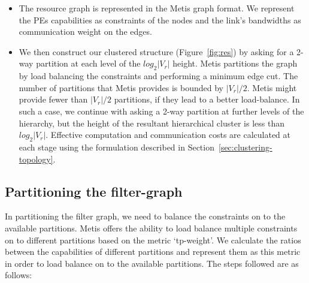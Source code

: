 \begin{itemize}


\item The resource graph is represented in the Metis graph format. We
  represent the PEs capabilities as constraints of the nodes and the
  link's bandwidths as communication weight on the edges.

\item We then construct our clustered structure (Figure~\ref{fig:res})
  by asking for a 2-way partition at each level of the $log_2|V_r|$
  height. Metis partitions the graph by load balancing the constraints
  and performing a minimum edge cut. The number of partitions that Metis
  provides is bounded by $|V_r|/2$. Metis might provide fewer than
  $|V_r|/2$ partitions, if they lead to a better load-balance. In such a
  case, we continue with asking a 2-way partition at further levels of
  the hierarchy, but the height of the resultant hierarchical cluster is
  less than $log_2|V_r|$. Effective computation and communication costs
  are calculated at each stage using the formulation described in
  Section~\ref{sec:clustering-topology}.

\end{itemize}

\subsection{Partitioning the filter-graph}
\label{sec:part-filter-graph}

In partitioning the filter graph, we need to balance the constraints on to
the available partitions. Metis offers the ability to load balance
multiple constraints on to different partitions based on the metric
\mbox{`tp-weight'}. We calculate the ratios between the capabilities of
different partitions and represent them as this metric in order to load
balance on to the available partitions. The steps followed are as
follows:

